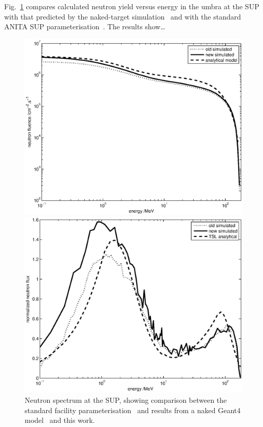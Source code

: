 \documentclass[11pt,a4paper]{IEEEtran}
\let\MYoriglatexcaption\caption
\renewcommand{\caption}[2][\relax]{\MYoriglatexcaption[#2]{#2}}
\begin{document}
Fig.~\ref{fig:SUPSpectraComparison} compares calculated neutron yield versus energy in the umbra at the SUP with that predicted by the naked-target simulation~\cite{Platt13} and with the standard ANITA SUP parameterisation~\cite{Prokofiev2009}.
The results show\ldots
{}

\begin{figure}[t]
    \begin{minipage}{\columnwidth}
        \includegraphics[width=\columnwidth]{SUPComparedIFluxRADECS.eps}
    \end{minipage}
    \begin{minipage}{\columnwidth}
        \includegraphics[width=\columnwidth]{SUPNormalisedRADECS.eps}
    \end{minipage}
	\caption{
        Neutron spectrum at the SUP, showing comparison between the standard facility parameterisation~\cite{Prokofiev2009} and results from a naked Geant4 model~\cite{Platt13} and this work.
    }
	\label{fig:SUPSpectraComparison}
\end{figure}
\end{document}
